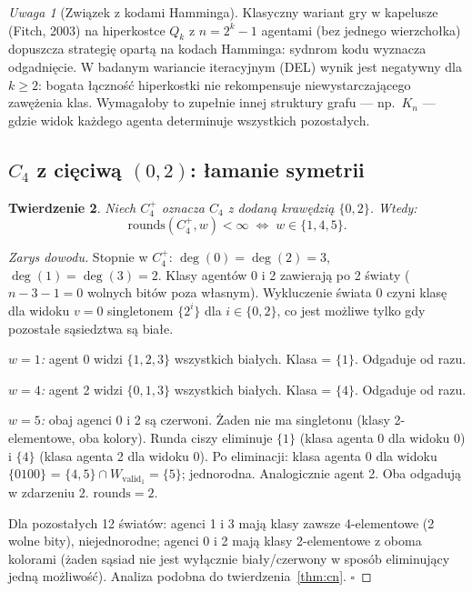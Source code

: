 \documentclass[12pt,a4paper]{article}
\theoremstyle{plain}
\newtheorem{theorem}{Twierdzenie}[section]
\theoremstyle{definition}
\theoremstyle{remark}
\newtheorem{remark}[theorem]{Uwaga}
\newcommand{\rounds}{\mathrm{rounds}}
\newcommand{\Wval}{W_{\mathrm{valid}}}
\begin{document}
\begin{remark}[Związek z kodami Hamminga]
Klasyczny wariant gry w kapelusze (Fitch, 2003) na hiperkostce $Q_k$ z $n = 2^k{-}1$ agentami (bez jednego wierzchołka) dopuszcza strategię opartą na kodach Hamminga: sydnrom kodu wyznacza odgadnięcie. W badanym wariancie iteracyjnym (DEL) wynik jest negatywny dla $k \ge 2$: bogata łączność hiperkostki nie rekompensuje niewystarczającego zawężenia klas. Wymagałoby to zupełnie innej struktury grafu — np.\ $K_n$ — gdzie widok każdego agenta determinuje wszystkich pozostałych.
\end{remark}

\subsection{$C_4$ z cięciwą $(0,2)$: łamanie symetrii}

\begin{theorem}
\label{thm:chord}
Niech $C_4^+$ oznacza $C_4$ z dodaną krawędzią $\{0,2\}$. Wtedy:
$$\rounds(C_4^+, w) < \infty \;\iff\; w \in \{1, 4, 5\}.$$
\end{theorem}

\begin{proof}[Zarys dowodu]
Stopnie w $C_4^+$: $\deg(0) = \deg(2) = 3$, $\deg(1) = \deg(3) = 2$. Klasy agentów 0 i 2 zawierają po 2 światy ($n-3-1 = 0$ wolnych bitów poza własnym). Wykluczenie świata 0 czyni klasę dla widoku $v=0$ singletonem $\{2^i\}$ dla $i \in \{0,2\}$, co jest możliwe tylko gdy pozostałe sąsiedztwa są białe.

\emph{$w=1$:} agent 0 widzi $\{1,2,3\}$ wszystkich białych. Klasa = $\{1\}$. Odgaduje od razu.

\emph{$w=4$:} agent 2 widzi $\{0,1,3\}$ wszystkich białych. Klasa = $\{4\}$. Odgaduje od razu.

\emph{$w=5$:} obaj agenci 0 i 2 są czerwoni. Żaden nie ma singletonu (klasy 2-elementowe, oba kolory). Runda ciszy eliminuje $\{1\}$ (klasa agenta 0 dla widoku 0) i $\{4\}$ (klasa agenta 2 dla widoku 0). Po eliminacji: klasa agenta 0 dla widoku $\{0100\}$ = $\{4,5\}\cap\Wval_1 = \{5\}$; jednorodna. Analogicznie agent 2. Oba odgadują w zdarzeniu 2. $\rounds = 2$.

Dla pozostałych 12 światów: agenci 1 i 3 mają klasy zawsze 4-elementowe (2 wolne bity), niejednorodne; agenci 0 i 2 mają klasy 2-elementowe z oboma kolorami (żaden sąsiad nie jest wyłącznie biały/czerwony w sposób eliminujący jedną możliwość). Analiza podobna do twierdzenia~\ref{thm:cn}. $\square$
\end{proof}
\end{document}
